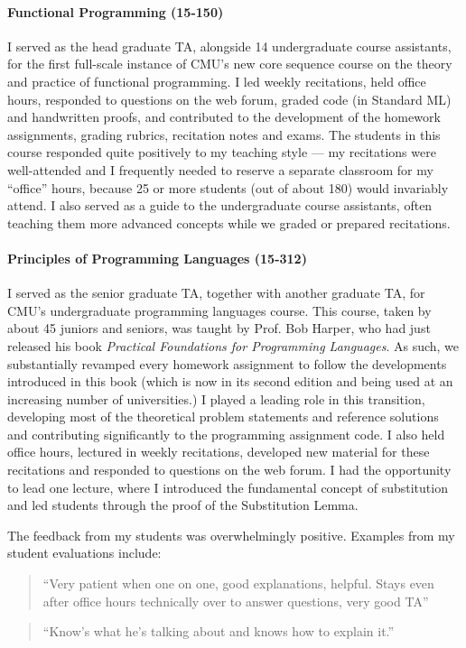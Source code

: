 \documentclass[9pt]{extarticle}
\begin{document}
\paragraph{Functional Programming (15-150)} I served as the head graduate TA, alongside 14 undergraduate course assistants, for the first full-scale instance of CMU's new core sequence course on the theory and practice of functional programming. I led weekly recitations, held office hours, responded to questions on the web forum, graded code (in Standard ML) and handwritten proofs, and contributed to the development of the homework assignments, grading rubrics, recitation notes and exams. The students in this course responded quite positively to my teaching style --- my recitations were well-attended and I frequently needed to reserve a separate classroom for my ``office'' hours, because 25 or more students (out of about 180) would invariably attend. I also served as a guide to the undergraduate course assistants, often teaching them more advanced concepts while we graded or prepared recitations.

\paragraph{Principles of Programming Languages (15-312)} I served as the senior graduate TA, together with another graduate TA, for CMU's undergraduate programming languages course. This course, taken by about 45 juniors and seniors, was taught by Prof. Bob Harper, who had just released his book \emph{Practical Foundations for Programming Languages}. As such, we substantially revamped every homework assignment to follow the developments introduced in this book (which is now in its second edition and being used at an increasing number of universities.) I played a leading role in this transition, developing most of the theoretical problem statements and reference solutions and contributing significantly to the programming assignment code. I also held office hours, lectured in weekly recitations, developed new material for these recitations and responded to questions on the web forum. I had the opportunity to lead one lecture, where I introduced the fundamental concept of {substitution} and led students through the proof of the Substitution Lemma. 

The feedback from my students was overwhelmingly positive. Examples from my student evaluations include:

\begin{quote}
``Very patient when one on one, good explanations, helpful. Stays even after office hours technically over to answer questions, very good TA''
\end{quote}
\begin{quote}
``Know's what he's talking about and knows how to explain it.''
\end{quote}
\end{document}
